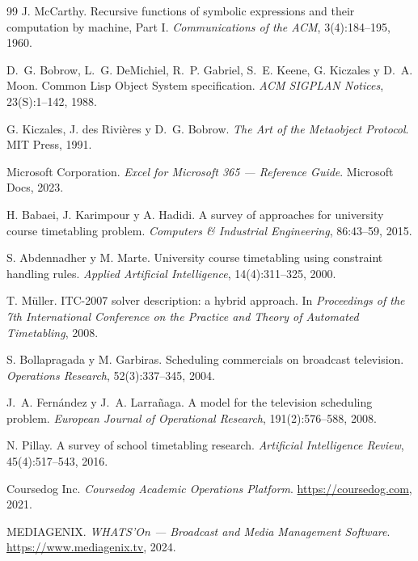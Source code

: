 \documentclass[12pt,a4paper]{report}
\theoremstyle{defstyle}
\begin{document}
\begin{thebibliography}{99}
J. McCarthy.
\newblock Recursive functions of symbolic expressions and their computation by
  machine, {P}art {I}.
\newblock \textit{Communications of the ACM}, 3(4):184--195, 1960.

D.~G. Bobrow, L.~G. DeMichiel, R.~P. Gabriel, S.~E. Keene, G. Kiczales y D.~A. Moon.
\newblock Common Lisp Object System specification.
\newblock \textit{ACM SIGPLAN Notices}, 23(S):1--142, 1988.

G. Kiczales, J. des Rivières y D.~G. Bobrow.
\newblock \textit{The Art of the Metaobject Protocol}.
\newblock MIT Press, 1991.

{Microsoft Corporation}.
\newblock \textit{Excel for Microsoft 365 --- Reference Guide}.
\newblock Microsoft Docs, 2023.

H. Babaei, J. Karimpour y A. Hadidi.
\newblock A survey of approaches for university course timetabling problem.
\newblock \textit{Computers \& Industrial Engineering}, 86:43--59, 2015.

S. Abdennadher y M. Marte.
\newblock University course timetabling using constraint handling rules.
\newblock \textit{Applied Artificial Intelligence}, 14(4):311--325, 2000.

T. M\"uller.
\newblock ITC-2007 solver description: a hybrid approach.
\newblock In \textit{Proceedings of the 7th International Conference on the
  Practice and Theory of Automated Timetabling}, 2008.

S. Bollapragada y M. Garbiras.
\newblock Scheduling commercials on broadcast television.
\newblock \textit{Operations Research}, 52(3):337--345, 2004.

J.~A. Fern\'andez y J.~A. Larra\~naga.
\newblock A model for the television scheduling problem.
\newblock \textit{European Journal of Operational Research}, 191(2):576--588,
  2008.

N. Pillay.
\newblock A survey of school timetabling research.
\newblock \textit{Artificial Intelligence Review}, 45(4):517--543, 2016.

{Coursedog Inc.}
\newblock \textit{Coursedog Academic Operations Platform}.
\newblock \url{https://coursedog.com}, 2021.

{MEDIAGENIX}.
\newblock \textit{WHATS'On --- Broadcast and Media Management Software}.
\newblock \url{https://www.mediagenix.tv}, 2024.


\end{thebibliography}
\end{document}
